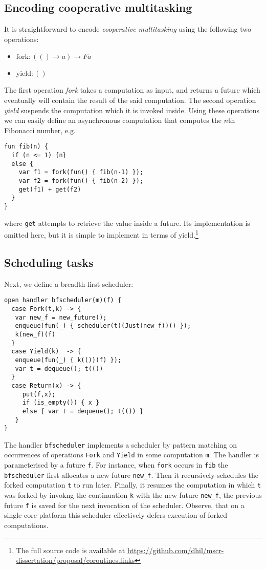 \documentclass[preprint,10pt,numbers]{sigplanconf}
\begin{document}
\subsection{Encoding cooperative multitasking}
It is straightforward to encode \emph{cooperative multitasking} using the following two operations:
\begin{itemize}
  \item $\text{fork} : (() \to a) \to F a$
  \item $\text{yield} : ()$
\end{itemize}
The first operation \emph{fork} takes a computation as input, and returns a future which eventually will contain the result of the said computation. The second operation \emph{yield} suspends the computation which it is invoked inside. Using these operations we can easily define an asynchronous computation that computes the $n$th Fibonacci number, e.g. 
\begin{lstlisting}[style={links},caption={}]
fun fib(n) {
  if (n <= 1) {n}
  else {
    var f1 = fork(fun() { fib(n-1) });
    var f2 = fork(fun() { fib(n-2) });
    get(f1) + get(f2)
  }
}
\end{lstlisting}
where \texttt{get} attempts to retrieve the value inside a future. Its implementation is omitted here, but it is simple to implement in terms of yield.\footnote{The full source code is available at \url{https://github.com/dhil/mscr-dissertation/proposal/coroutines.links}} 
\subsection{Scheduling tasks}
Next, we define a breadth-first scheduler:
\begin{lstlisting}[style={links},caption={}]
open handler bfscheduler(m)(f) {
  case Fork(t,k) -> {
   var new_f = new_future();
   enqueue(fun(_) { scheduler(t)(Just(new_f))() });
   k(new_f)(f)
  }
  case Yield(k)  -> { 
   enqueue(fun(_) { k(())(f) }); 
   var t = dequeue(); t(()) 
  }
  case Return(x) -> {
     put(f,x);
     if (is_empty()) { x }
     else { var t = dequeue(); t(()) }
   } 
}
\end{lstlisting}
The handler \texttt{bfscheduler} implements a scheduler by pattern matching on occurrences of operations \texttt{Fork} and \texttt{Yield} in some computation \texttt{m}. The handler is parameterised by a future \texttt{f}. For instance, when \texttt{fork} occurs in \texttt{fib} the \texttt{bfscheduler} first allocates a new future \texttt{new\_f}. Then it recursively schedules the forked computation \texttt{t} to run later. Finally, it resumes the computation in which \texttt{t} was forked by invokng the continuation \texttt{k} with the new future \texttt{new\_f}, the previous future \texttt{f} is saved for the next invocation of the scheduler. Observe, that on a single-core platform this scheduler effectively defers execution of forked computations.
\end{document}
